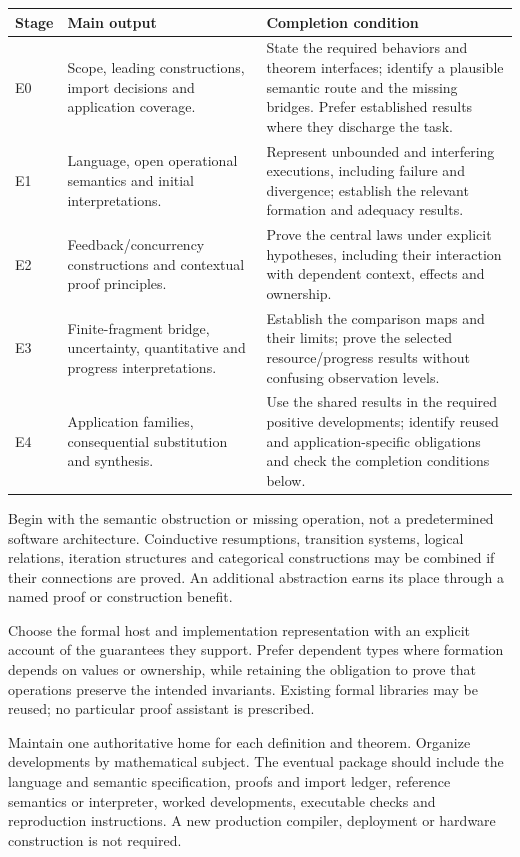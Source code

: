 \documentclass[11pt,a4paper]{article}
\begin{document}
\begin{longtable}{@{}p{.10\linewidth}p{.30\linewidth}p{.50\linewidth}@{}}
\toprule Stage & Main output & Completion condition\\ \midrule
\endhead
E0 & Scope, leading constructions, import decisions and application coverage. & State the required behaviors and theorem interfaces; identify a plausible semantic route and the missing bridges. Prefer established results where they discharge the task.\\
E1 & Language, open operational semantics and initial interpretations. & Represent unbounded and interfering executions, including failure and divergence; establish the relevant formation and adequacy results.\\
E2 & Feedback/concurrency constructions and contextual proof principles. & Prove the central laws under explicit hypotheses, including their interaction with dependent context, effects and ownership.\\
E3 & Finite-fragment bridge, uncertainty, quantitative and progress interpretations. & Establish the comparison maps and their limits; prove the selected resource/progress results without confusing observation levels.\\
E4 & Application families, consequential substitution and synthesis. & Use the shared results in the required positive developments; identify reused and application-specific obligations and check the completion conditions below.\\
\bottomrule
\end{longtable}

Begin with the semantic obstruction or missing operation, not a predetermined software architecture. Coinductive resumptions, transition systems, logical relations, iteration structures and categorical constructions may be combined if their connections are proved. An additional abstraction earns its place through a named proof or construction benefit.

Choose the formal host and implementation representation with an explicit account of the guarantees they support. Prefer dependent types where formation depends on values or ownership, while retaining the obligation to prove that operations preserve the intended invariants. Existing formal libraries may be reused; no particular proof assistant is prescribed.

Maintain one authoritative home for each definition and theorem. Organize developments by mathematical subject. The eventual package should include the language and semantic specification, proofs and import ledger, reference semantics or interpreter, worked developments, executable checks and reproduction instructions. A new production compiler, deployment or hardware construction is not required.
\end{document}
